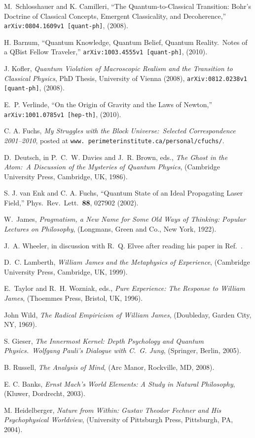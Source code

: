 \begin{thebibliography}{100}
M.~Schlosshauer and K. Camilleri, ``The Quantum-to-Classical Transition: Bohr's Doctrine of Classical Concepts, Emergent Classicality, and Decoherence,'' {\tt arXiv:0804.1609v1 [quant-ph]}, (2008).

H. Barnum, ``Quantum Knowledge, Quantum Belief, Quantum Reality.\ Notes of a QBist Fellow Traveler,'' {\tt arXiv:1003.4555v1 [quant-ph]}, (2010).

J. Kofler, {\sl Quantum Violation of Macroscopic Realism and the Transition to Classical Physics}, PhD Thesis, University of Vienna (2008), {\tt 	 arXiv:0812.0238v1 [quant-ph]}, (2008).

E.~P. Verlinde, ``On the Origin of Gravity and the Laws of Newton,'' {\tt arXiv:1001.0785v1 [hep-th]}, (2010).

C. A. Fuchs, {\sl My Struggles with the Block Universe:\ Selected Correspondence 2001--2010}, posted at {\tt www. perimeterinstitute.ca/personal/cfuchs/}.

D.~Deutsch, in P.~C.~W. Davies and J.~R. Brown, eds., {\sl The Ghost in the Atom:\ A Discussion of the Mysteries of Quantum Physics}, (Cambridge University Press, Cambridge, UK, 1986).

S. J. van Enk and C. A. Fuchs, ``Quantum State of an Ideal Propagating Laser Field,'' Phys.\ Rev.\ Lett.\ {\bf 88},
027902 (2002).

W.~James, {\sl Pragmatism, a New Name for Some Old Ways of Thinking: Popular Lectures on Philosophy}, (Longmans, Green and Co., New York, 1922).

J.~A. Wheeler, in discussion with R.~Q. Elvee after reading his paper in Ref.\ \cite{Wheeler82c}.

D.~C. Lamberth, {\sl William James and the Metaphysics of Experience}, (Cambridge University Press, Cambridge, UK, 1999).

E.~Taylor and R.~H. Wozniak, eds., {\sl Pure Experience: The Response to William James}, (Thoemmes Press, Bristol, UK, 1996).

John Wild, {\sl The Radical Empiricism of William James}, (Doubleday, Garden City, NY, 1969).

S. Gieser, {\sl The Innermost Kernel: Depth Psychology and Quantum Physics.~Wolfgang Pauli's Dialogue with C.~G. Jung}, (Springer, Berlin, 2005).

B. Russell, {\sl The Analysis of Mind}, (Arc Manor, Rockville, MD, 2008).

E. C. Banks, {\sl Ernst Mach's World Elements: A Study in Natural Philosophy}, (Kluwer, Dordrecht, 2003).

M. Heidelberger, {\sl Nature from Within: Gustav Theodor Fechner and His Psychophysical Worldview}, (University of Pittsburgh Press, Pittsburgh, PA, 2004).

\end{thebibliography}






